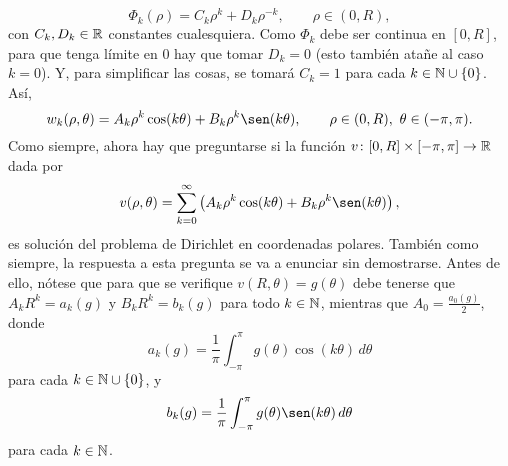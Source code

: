\documentclass[a4paper, 12pt, extrafontsizes]{memoir}
\begin{document}
\[\Phi_k(\rho) = C_k\rho^{k}+D_k \rho^{-k}, \qquad \rho \in (0,R),\]
con $C_k,D_k \in \mathbb R$ constantes cualesquiera. Como $\Phi_k$ debe ser continua en $[0,R]$, para que tenga límite en $0$ hay que tomar $D_k = 0$ (esto también atañe al caso $k = 0$). Y, para simplificar las cosas, se tomará $C_k = 1$ para cada $k \in \mathbb N \cup \{0\}$. Así,
\[w_k(\rho,\theta) = A_k\rho^k\cos(k\theta)+B_k\rho^k\sen(k\theta), \qquad \rho \in (0,R), \ \theta \in (-\pi,\pi).\]
Como siempre, ahora hay que preguntarse si la función $v \colon [0,R] \times [-\pi,\pi] \to \mathbb R$ dada por
\[v(\rho,\theta) = \sum_{k=0}^\infty \left(A_k\rho^k \cos(k\theta)+B_k\rho^k\sen(k\theta)\right),\]
es solución del problema de Dirichlet en coordenadas polares. También como siempre, la respuesta a esta pregunta se va a enunciar sin demostrarse. Antes de ello, nótese que para que se verifique $v(R,\theta) = g(\theta)$ debe tenerse que $A_kR^k = a_k(g)$ y $B_kR^k = b_k(g)$ para todo $k \in \mathbb N$, mientras que $A_0 = \frac{a_0(g)}{2}$, donde
\[a_k(g) = \frac{1}{\pi}\int_{-\pi}^\pi g(\theta) \cos(k\theta) \, d\theta\]
para cada $k \in\mathbb N \cup \{0\}$, y
\[b_k(g) = \frac{1}{\pi}\int_{-\pi}^\pi g(\theta) \sen(k\theta) \, d\theta\]
para cada $k \in \mathbb N$.
\end{document}
